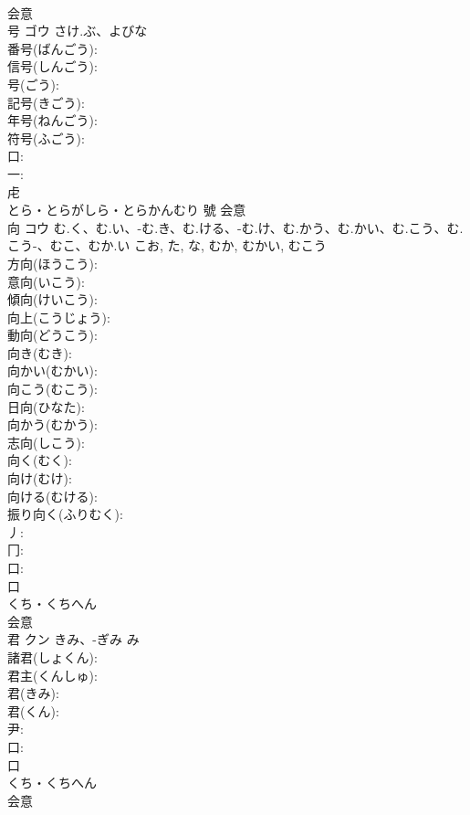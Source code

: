 \documentclass[8pt]{extreport}
\begin{document}
\begin{CJK}{UTF8}{min}
\\	会意 
\\	号	ゴウ	さけ.ぶ、よびな		
\\	番号(ばんごう): 
\\	信号(しんごう): 
\\	号(ごう): 
\\	記号(きごう): 
\\	年号(ねんごう): 
\\	符号(ふごう): 
\\	口: 
\\	一: 
\\	虍	
\\	とら・とらがしら・とらかんむり	號	会意 
\\	向	コウ	む.く、む.い、-む.き、む.ける、-む.け、む.かう、む.かい、む.こう、む.こう-、むこ、むか.い	こお, た, な, むか, むかい, むこう	
\\	方向(ほうこう): 
\\	意向(いこう): 
\\	傾向(けいこう): 
\\	向上(こうじょう): 
\\	動向(どうこう): 
\\	向き(むき): 
\\	向かい(むかい): 
\\	向こう(むこう): 
\\	日向(ひなた): 
\\	向かう(むかう): 
\\	志向(しこう): 
\\	向く(むく): 
\\	向け(むけ): 
\\	向ける(むける): 
\\	振り向く(ふりむく): 
\\	丿: 
\\	冂: 
\\	口: 
\\	口	
\\	くち・くちへん	
\\	会意 
\\	君	クン	きみ、-ぎみ	み	
\\	諸君(しょくん): 
\\	君主(くんしゅ): 
\\	君(きみ): 
\\	君(くん): 
\\	尹: 
\\	口: 
\\	口	
\\	くち・くちへん	
\\	会意 

\end{CJK}
\end{document}
